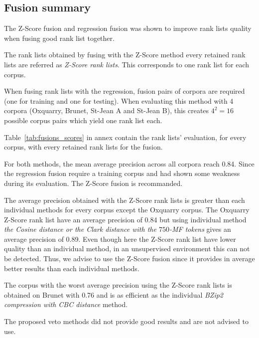 \subsection{Fusion summary}

The Z-Score fusion and regression fusion was shown to improve rank lists quality when fusing good rank list together.

The rank lists obtained by fusing with the Z-Score method every retained rank lists are referred as \textit{Z-Score rank lists}.
This corresponds to one rank list for each corpus.

When fusing rank lists with the regression, fusion pairs of corpora are required (one for training and one for testing).
When evaluating this method with 4 corpora (Oxquarry, Brunet, St-Jean A and St-Jean B), this creates $4^2 = 16$ possible corpus pairs which yield one rank list each.

Table~\ref{tab:fusions_scores} in annex contain the rank lists' evaluation, for every corpus, with every retained rank lists for the fusion.

For both methods, the mean average precision across all corpora reach 0.84.
Since the regression fusion require a training corpus and had shown some weakness during its evaluation.
The Z-Score fusion is recommanded.

The average precision obtained with the Z-Score rank lists is greater than each individual methods for every corpus except the Oxquarry corpus.
The Oxquarry Z-Score rank list have an average precision of 0.84 but using individual method \textit{the Cosine distance or the Clark distance with the $750$-MF tokens} gives an average precision of 0.89.
Even though here the Z-Score rank list have lower quality than an individual method, in an unsupervised environment this can not be detected.
Thus, we advise to use the Z-Score fusion since it provides in average better results than each individual methods.

The corpus with the worst average precision using the Z-Score rank lists is obtained on Brunet with 0.76 and is as efficient as the individual \textit{BZip2 compression with CBC distance} method.

The proposed veto methods did not provide good results and are not advised to use.
